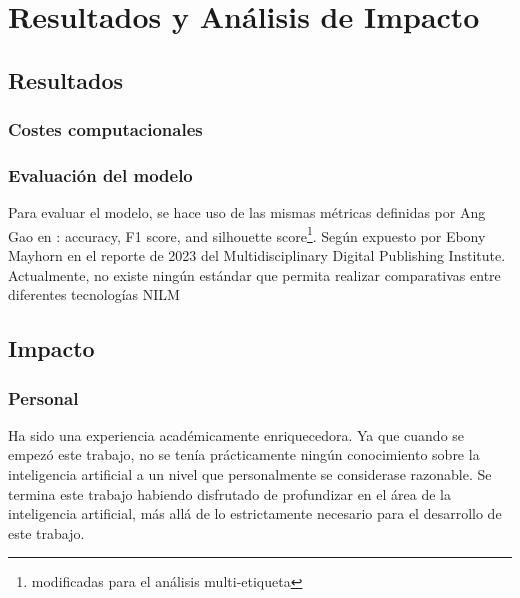 \chapter{Resultados y Análisis de Impacto}

\section{Resultados}

\subsection{Costes computacionales}

\subsection{Evaluación del modelo}
Para evaluar el modelo, se hace uso de las mismas métricas definidas por Ang Gao en \autocite{GAO2023109443}: accuracy, F1 score, and silhouette score\footnote{modificadas para el análisis multi-etiqueta}.
Según expuesto por Ebony Mayhorn en el reporte de 2023 del Multidisciplinary Digital Publishing Institute.  Actualmente, no existe ningún estándar que permita realizar comparativas entre diferentes tecnologías NILM \autocite{NILMreview2023} \autocite{mayhorn2015load}

\section{Impacto}
\subsection{Personal}
Ha sido una experiencia académicamente enriquecedora. Ya que cuando se empezó este trabajo, no se tenía prácticamente ningún conocimiento sobre la inteligencia artificial a un nivel que personalmente se considerase razonable. Se termina este trabajo habiendo disfrutado de profundizar en el área de la inteligencia artificial, más allá de lo estrictamente necesario para el desarrollo de este trabajo. 

